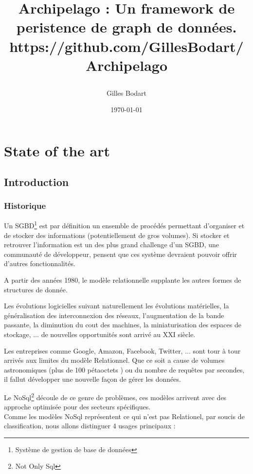 \documentclass[a4paper,12pt,twoside, fleqn]{report}
\author{Gilles Bodart}
\date{\today}
\title{%
    \begin{minipage}\linewidth
        \centering\bfseries\sffamily
        Archipelago : Un framework de peristence de graph de données.
        \vskip4pt
        \large https://github.com/GillesBodart/Archipelago
    \end{minipage}
}
\begin{document}
\maketitle
\tableofcontents
\part{State of the art}
\chapter{Introduction}

\section{Historique}  

Un SGBD\footnote{Système de gestion de base de données} est par définition un ensemble de procédés permettant d'organiser et de stocker des informations (potentiellement de gros volumes). Si stocker et retrouver l'information est un des plus grand challenge d'un SGBD, une communauté de développeur, pensent que ces système devraient pouvoir offrir d'autres fonctionnalités. 

A partir des années 1980, le modèle relationnelle supplante les autres formes de structures de donnée.

Les évolutions logicielles suivant naturellement les évolutions matérielles, la généralisation des interconnexion des réseaux, l'augmentation de la bande passante, la diminution du cout des machines, la miniaturisation des espaces de stockage, ... de nouvelles opportunités sont arrivé au XXI siècle.

Les entreprises comme Google, Amazon, Facebook, Twitter, ... sont tour à tour arrivés aux limites du modèle Relationnel. Que ce soit a cause de volumes astronomiques (plus de 100 pétaoctets ) ou du nombre de requêtes par secondes, il fallut développer une nouvelle façon de gérer les données.

Le NoSql\footnote{Not Only Sql} découle de ce genre de problèmes, ces modèles arrivent avec des approche optimisée pour des secteurs spécifiques. \\
Comme les modèles NoSql représentent ce qui n'est pas Relationel, par soucis de classification, nous allons distinguer 4 usages principaux :
\end{document}
